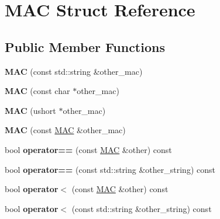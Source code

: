 \hypertarget{structMAC}{}\section{M\+AC Struct Reference}
\label{structMAC}
\subsection*{Public Member Functions}
\begin{DoxyCompactItemize}
\item 
{\bfseries M\+AC} (const std\+::string \&other\+\_\+mac)\hypertarget{structMAC_ae2de91cf5744ce0232220d4f06943120}{}\label{structMAC_ae2de91cf5744ce0232220d4f06943120}

\item 
{\bfseries M\+AC} (const char $\ast$other\+\_\+mac)\hypertarget{structMAC_a44b3c74ae71c8a4d25e2fe260087053c}{}\label{structMAC_a44b3c74ae71c8a4d25e2fe260087053c}

\item 
{\bfseries M\+AC} (ushort $\ast$other\+\_\+mac)\hypertarget{structMAC_a2d66b00eb9a189233549d2454932c321}{}\label{structMAC_a2d66b00eb9a189233549d2454932c321}

\item 
{\bfseries M\+AC} (const \hyperlink{structMAC}{M\+AC} \&other\+\_\+mac)\hypertarget{structMAC_a04498a5c27f36df601f83604da888f3e}{}\label{structMAC_a04498a5c27f36df601f83604da888f3e}

\item 
bool {\bfseries operator==} (const \hyperlink{structMAC}{M\+AC} \&other) const \hypertarget{structMAC_afb8130f7b3c42662da0530acec672009}{}\label{structMAC_afb8130f7b3c42662da0530acec672009}

\item 
bool {\bfseries operator==} (const std\+::string \&other\+\_\+string) const \hypertarget{structMAC_a3258f3f12ea229dce32a912c2d6f02ff}{}\label{structMAC_a3258f3f12ea229dce32a912c2d6f02ff}

\item 
bool {\bfseries operator$<$} (const \hyperlink{structMAC}{M\+AC} \&other) const \hypertarget{structMAC_a6f58d8e7e0ce6ed738aa633e8357ba29}{}\label{structMAC_a6f58d8e7e0ce6ed738aa633e8357ba29}

\item 
bool {\bfseries operator$<$} (const std\+::string \&other\+\_\+string) const \hypertarget{structMAC_ab292ef694024f72d65bde931e6f41b53}{}\label{structMAC_ab292ef694024f72d65bde931e6f41b53}


\end{DoxyCompactItemize}

